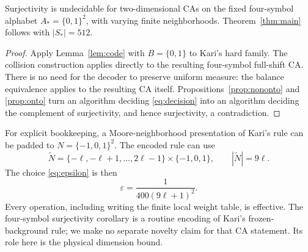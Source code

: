 \begin{corollary}\label{cor:512}
Surjectivity is undecidable for two-dimensional CAs on the fixed four-symbol alphabet \(A_*=\{0,1\}^2\), with varying finite neighborhoods. Theorem~\ref{thm:main} follows with \(|S_*|=512\).
\end{corollary}
\begin{proof}
Apply Lemma~\ref{lem:code} with \(B=\{0,1\}\) to Kari's hard family. The collision construction applies directly to the resulting four-symbol full-shift CA. There is no need for the decoder to preserve uniform measure: the balance equivalence applies to the resulting CA itself. Propositions~\ref{prop:nononto} and \ref{prop:onto} turn an algorithm deciding \eqref{eq:decision} into an algorithm deciding the complement of surjectivity, and hence surjectivity, a contradiction.
\end{proof}

For explicit bookkeeping, a Moore-neighborhood presentation of Kari's rule can be padded to \(N=\{-1,0,1\}^2\). The encoded rule can use
\begin{equation}
 \widetilde N=
 \{-\ell,-\ell+1,\ldots,2\ell-1\}\times\{-1,0,1\},
 \qquad |\widetilde N|=9\ell.
\end{equation}
The choice \eqref{eq:epsilon} is then
\begin{equation}
 \varepsilon=\frac1{400(9\ell+1)^2}.
\end{equation}
Every operation, including writing the finite local weight table, is effective. The four-symbol surjectivity corollary is a routine encoding of Kari's frozen-background rule; we make no separate novelty claim for that CA statement. Its role here is the physical dimension bound.

